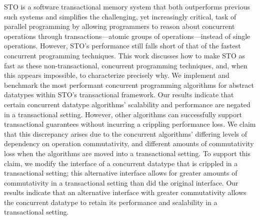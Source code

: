 STO is a software transactional memory system that both outperforms previous such systems and simplifies the challenging, yet increasingly critical, task of parallel programming by allowing programmers to reason about concurrent operations through transactions---atomic groups of operations---instead of single operations.  
However, STO's performance still falls short of that of the fastest concurrent programming techniques. This work discusses how to make STO as fast as these non-transactional, concurrent programming techniques, and, when this appears impossible, to characterize precisely why. 
We implement and benchmark the most performant concurrent programming algorithms for abstract datatypes within STO's transactional framework. Our results indicate that certain concurrent datatype algorithms' scalability and performance are negated in a transactional setting.
However, other algorithms can successfully support transactional guarantees without incurring a crippling performance loss. We claim that this discrepancy arises due to the concurrent algorithms' differing levels of dependency on operation commutativity, and different amounts of commutativity loss when the algorithms are moved into a transactional setting. To support this claim, we modify the interface of a concurrent datatype that is crippled in a transactional setting; this alternative interface allows for greater amounts of commutativity in a transactional setting than did the original interface. Our results indicate that an alternative interface with greater commutativity allows the concurrent datatype to retain its performance and scalability in a transactional setting.
